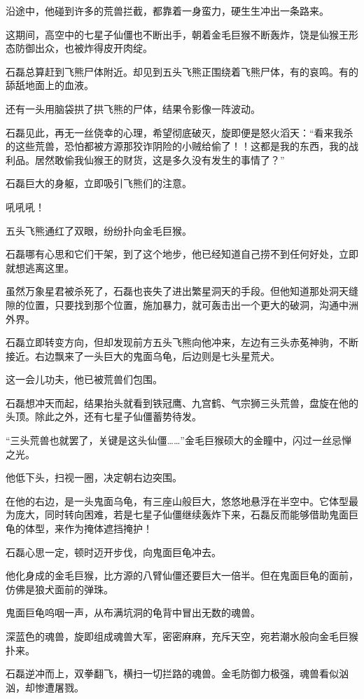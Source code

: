 \begin{this_body}
沿途中，他碰到许多的荒兽拦截，都靠着一身蛮力，硬生生冲出一条路来。

这期间，高空中的七星子仙僵也不断出手，朝着金毛巨猴不断轰炸，饶是仙猴王形态防御出众，也被炸得皮开肉绽。

石磊总算赶到飞熊尸体附近。却见到五头飞熊正围绕着飞熊尸体，有的哀鸣。有的舔舐地面上的血液。

还有一头用脑袋拱了拱飞熊的尸体，结果令影像一阵波动。

石磊见此，再无一丝侥幸的心理，希望彻底破灭，旋即便是怒火滔天：“看来我杀的这些荒兽，恐怕都被方源那狡诈阴险的小贼给偷了！！这都是我的东西，我的战利品。居然敢偷我仙猴王的财货，这是多久没有发生的事情了？”

石磊巨大的身躯，立即吸引飞熊们的注意。

吼吼吼！

五头飞熊通红了双眼，纷纷扑向金毛巨猴。

石磊哪有心思和它们干架，到了这个地步，他已经知道自己捞不到任何好处，立即就想逃离这里。

虽然万象星君被杀死了，石磊也丧失了进出繁星洞天的手段。但他知道那处洞天缝隙的位置，只要找到那个位置，施加暴力，就可轰击出一个更大的破洞，沟通中洲外界。

石磊立即转变方向，但却发现前方五头飞熊向他冲来，左边有三头赤莬神驹，不断接近。右边飘来了一头巨大的鬼面乌龟，后边则是七头星荒犬。

这一会儿功夫，他已被荒兽们包围。

石磊想冲天而起，结果抬头就看到铁冠鹰、九宫鹤、气宗狮三头荒兽，盘旋在他的头顶。除此之外，还有七星子仙僵蓄势待发。

“三头荒兽也就罢了，关键是这头仙僵……”金毛巨猴硕大的金瞳中，闪过一丝忌惮之光。

他低下头，扫视一圈，决定朝右边突围。

在他的右边，是一头鬼面乌龟，有三座山般巨大，悠悠地悬浮在半空中。它体型最为庞大，同时转向困难，若是七星子仙僵继续轰炸下来，石磊反而能够借助鬼面巨龟的体型，来作为掩体遮挡掩护！

石磊心思一定，顿时迈开步伐，向鬼面巨龟冲去。

他化身成的金毛巨猴，比方源的八臂仙僵还要巨大一倍半。但在鬼面巨龟的面前，仿佛是狼犬面前的弹珠。

鬼面巨龟呜咽一声，从布满坑洞的龟背中冒出无数的魂兽。

深蓝色的魂兽，旋即组成魂兽大军，密密麻麻，充斥天空，宛若潮水般向金毛巨猴扑来。

石磊逆冲而上，双拳翻飞，横扫一切拦路的魂兽。金毛防御力极强，魂兽看似汹汹，却惨遭屠戮。


\end{this_body}
